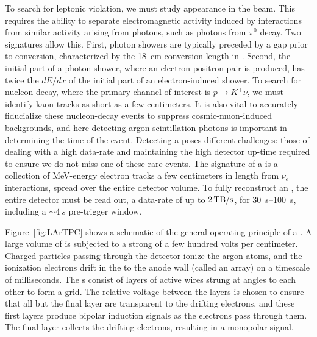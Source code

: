 To search for leptonic  violation, we must study \nue appearance in the  \numu beam. This requires the ability to separate electromagnetic activity induced by  \nue interactions from similar activity arising from photons, such as photons from $\pi^{0}$ decay. Two signatures allow this. First, photon showers are typically preceded by a gap prior to conversion, characterized by the \SI{18}{cm} conversion length in . Second, the initial part of a photon shower, where an electron-positron pair is produced, has twice the $dE/dx$ of the initial part of an electron-induced shower. To search for nucleon decay, where the primary channel of interest is $p\rightarrow K^{+}\overline{\nu}$, we must identify kaon tracks as short as a few centimeters. It is also vital to accurately fiducialize these nucleon-decay events to suppress cosmic-muon-induced backgrounds, and here detecting argon-scintillation photons is important in determining the time of the event. Detecting a  poses different challenges: those of dealing with a high data-rate and maintaining the high detector up-time required to ensure we do not miss one of these rare events. The signature of a  is a collection of MeV-energy electron tracks a few centimeters in length from  $\nu_{e}$ interactions, spread over the entire detector volume. To fully reconstruct an , the entire detector must be read out, a data-rate of up to $\SI{2}{\tera\byte/\second}$, for \SIrange{30}{100}{s}, including a $\sim\!\SI{4}{s}$ pre-trigger window.



Figure~\ref{fig:LArTPC} shows a schematic of the general operating principle of a  . A large volume of  is subjected to a strong \efield of a few hundred volts per centimeter. Charged particles passing through the detector ionize the argon atoms, and the ionization electrons drift in the \efield to the anode wall (called an  array) on a timescale of milliseconds. The  s consist of layers of active wires strung at angles to each other to form a grid. The relative voltage between the layers is chosen to ensure that all but the final layer are transparent to the drifting electrons, and these first layers produce bipolar induction signals as the electrons pass through them. The final layer collects the drifting electrons, resulting in a monopolar signal.

